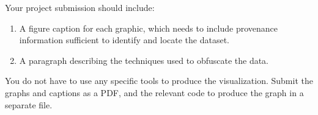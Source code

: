 \documentclass[]{book}
\theoremstyle{definition}
\newtheorem*{soln}{Solution}
\begin{document}
\begin{enumerate}
Your project submission should include:
\begin{enumerate}
\item A figure caption for each graphic, which needs to include provenance information sufficient to identify and locate the dataset.
\item A paragraph describing the techniques used to obfuscate the data.
\end{enumerate}

You do not have to use any specific tools to produce the visualization.  Submit the graphs and captions as a PDF, and the relevant code to produce the graph in a separate file.


\end{enumerate}
\end{document}
